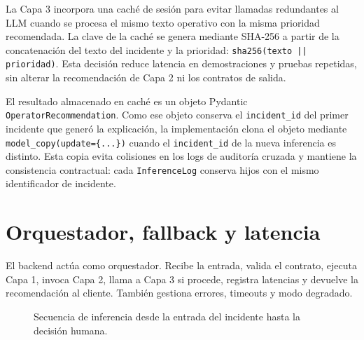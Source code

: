 La Capa 3 incorpora una caché de sesión para evitar llamadas redundantes al LLM cuando se procesa el mismo texto operativo con la misma prioridad recomendada. La clave de la caché se genera mediante SHA-256 a partir de la concatenación del texto del incidente y la prioridad: \texttt{sha256(texto || prioridad)}. Esta decisión reduce latencia en demostraciones y pruebas repetidas, sin alterar la recomendación de Capa 2 ni los contratos de salida.

El resultado almacenado en caché es un objeto Pydantic \texttt{OperatorRecommendation}. Como ese objeto conserva el \texttt{incident\_id} del primer incidente que generó la explicación, la implementación clona el objeto mediante \texttt{model\_copy(update=\{...\})} cuando el \texttt{incident\_id} de la nueva inferencia es distinto. Esta copia evita colisiones en los logs de auditoría cruzada y mantiene la consistencia contractual: cada \texttt{InferenceLog} conserva hijos con el mismo identificador de incidente.

\section{Orquestador, fallback y latencia}

El backend actúa como orquestador. Recibe la entrada, valida el contrato, ejecuta Capa 1, invoca Capa 2, llama a Capa 3 si procede, registra latencias y devuelve la recomendación al cliente. También gestiona errores, timeouts y modo degradado.

\begin{figure}[htbp]
\centering
\small
{}
\caption{Secuencia de inferencia desde la entrada del incidente hasta la decisión humana.}
\label{fig:secuencia-inferencia-cap6}
\end{figure}

